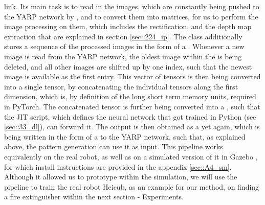 \href{https://github.com/mhubii/nmpc_pattern_generator/blob/719fde0bb73925923de85cbf379c5523e075dfeb/src/behavioural_augmentation_real_robot_external_data.cpp#L108}{\underline{link}}. Its main task is to read in the images, which are constantly being pushed to the YARP network by , and to convert them into  matrices, for us to perform the image processing on them, which includes the rectification, and the depth map extraction that are explained in section \ref{sec::224_ip}. The  class additionally stores a sequence of the processed images in the form of a . Whenever a new image is read from the YARP network, the oldest image within the  is being deleted, and all other images are shifted up by one index, such that the newest image is available as the first entry. This vector of tensors is then being converted into a single tensor, by concatenating the individual tensors along the first dimension, which is, by definition of the long short term memory units, required in PyTorch. The concatenated tensor is further being converted into a , such that the JIT script, which defines the neural network that got trained in Python (see \ref{sec::33_dl}), can forward it. The output is then obtained as a  yet again, which is being written in the form of a  to the YARP network, such that,  as explained above, the pattern generation can use it as input. This pipeline works equivalently on the real robot, as well as on a simulated version of it in Gazebo \cite{koenig2004design}, for which install instructions are provided in the appendix \ref{sec::A4_sm}. Although it allowed us to prototype within the simulation, we will use the pipeline to train the real robot Heicub, as an example for our method, on finding a fire extinguisher within the next section - Experiments.